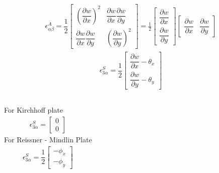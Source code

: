 \documentclass[9pt]{beamer}
\begin{document}
\begin{frame}
\begin{align*}
\epsilon_{\alpha \beta}^A = \dfrac{1}{2}
\begin{bmatrix}
 \left( \dfrac{\partial w}{\partial x} \right)^2 
 &
 \dfrac{\partial w}{\partial x}\dfrac{\partial w}{\partial y}  
\\
 \dfrac{\partial w}{\partial x}\dfrac{\partial w}{\partial y} 
 &
 \left( \dfrac{\partial w}{\partial y} \right)^2
\end{bmatrix}
=
\frac{1}{2}
\begin{bmatrix}
\dfrac{\partial w}{\partial x} \\
\dfrac{\partial w}{\partial y}
\end{bmatrix}
\begin{bmatrix}
\dfrac{\partial w}{\partial x} &
\dfrac{\partial w}{\partial y}
\end{bmatrix}
\end{align*}
\begin{align*}
\epsilon_{3\alpha}^S = \dfrac{1}{2}
\begin{bmatrix}
\dfrac{\partial w}{\partial x}-\theta_x 
\\
\dfrac{\partial w}{\partial y}-\theta_y 
\end{bmatrix} 
\end{align*}
\begin{columns}
For Kirchhoff plate
\begin{align*}
\epsilon_{3\alpha}^S =
\begin{bmatrix}
0
\\
0 
\end{bmatrix} 
\end{align*}
For Reissner - Mindlin Plate
\begin{align*}
\epsilon_{3\alpha}^S = \dfrac{1}{2}
\begin{bmatrix}
-\phi_x 
\\
-\phi_y 
\end{bmatrix} 
\end{align*}
\end{columns}
\end{frame}
\end{document}
